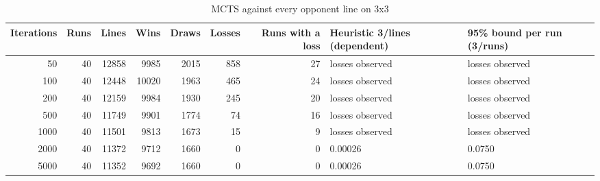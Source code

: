 \begin{table}[!t]
\centering
\caption{MCTS against every opponent line on 3x3}
\label{tab:verify_exhaustive}
\small
\begin{tabular}{rrrrrrrll}
\toprule
Iterations & Runs & Lines & Wins & Draws & Losses & Runs with a loss & Heuristic 3/lines (dependent) & 95\% bound per run (3/runs) \\
\midrule
50 & 40 & 12858 & 9985 & 2015 & 858 & 27 & losses observed & losses observed \\
100 & 40 & 12448 & 10020 & 1963 & 465 & 24 & losses observed & losses observed \\
200 & 40 & 12159 & 9984 & 1930 & 245 & 20 & losses observed & losses observed \\
500 & 40 & 11749 & 9901 & 1774 & 74 & 16 & losses observed & losses observed \\
1000 & 40 & 11501 & 9813 & 1673 & 15 & 9 & losses observed & losses observed \\
2000 & 40 & 11372 & 9712 & 1660 & 0 & 0 & 0.00026 & 0.0750 \\
5000 & 40 & 11352 & 9692 & 1660 & 0 & 0 & 0.00026 & 0.0750 \\
\bottomrule
\end{tabular}
\end{table}

